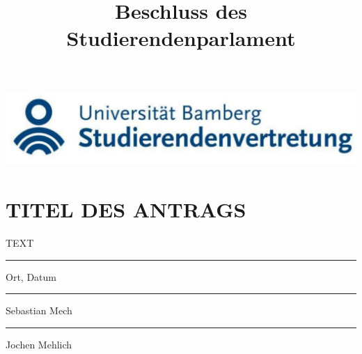 \documentclass{article}
\title{Beschluss des Studierendenparlament}
\begin{document}
\begin{center}
    \includegraphics[width=\textwidth]{stuve-logo.png}
\end{center}

\section*{TITEL DES ANTRAGS}

\vspace{50px}

TEXT

\vspace{100px}


\parbox{7cm}{\hrule
\strut \centering\footnotesize Ort, Datum} 

\vspace{50px}

\parbox{7cm}{\hrule
\strut \centering\footnotesize Sebastian Mech} \hfill\parbox{7cm}{\hrule
\strut \centering\footnotesize Jochen Mehlich}
\end{document}
